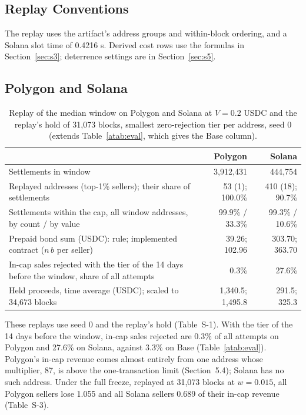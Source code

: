 \documentclass[10pt,a4paper]{article}
\newcommand{\vmax}{V}
\theoremstyle{plain}
\theoremstyle{remark}
\begin{document}
\subsection{Replay Conventions}
\label{sec:dep}

The replay uses the artifact's address groups and within-block ordering, and a Solana slot time of 0.4216 s. Derived cost rows use the formulas in Section~\ref{sec:s3}; deterrence settings are in Section~\ref{sec:s5}.

\subsection{Polygon and Solana}
\label{sec:other}

\begin{table}[!htbp]
\centering
\caption{Replay of the median window on Polygon and Solana at $\vmax=0.2$ USDC and the replay's hold of 31,073 blocks, smallest zero-rejection tier per address, seed 0 (extends Table~\ref{atab:eval}, which gives the Base column).}
\label{tab:S1}
\scriptsize
\setlength{\tabcolsep}{4pt}
\begin{tabular}{@{}>{\raggedright}p{4.6cm}rr@{}}
\toprule
& Polygon & Solana \\
\midrule
Settlements in window & 3,912,431 & 444,754 \\
Replayed addresses (top-1\% sellers); their share of settlements & 53 (1); 100.0\% & 410 (18); 90.7\% \\
Settlements within the cap, all window addresses, by count / by value & 99.9\% / 33.3\% & 99.3\% / 10.6\% \\
Prepaid bond sum (USDC): rule; implemented contract ($n\,b$ per seller) & 39.26; 102.96 & 303.70; 363.70 \\
In-cap sales rejected with the tier of the 14 days before the window, share of all attempts & 0.3\% & 27.6\% \\
Held proceeds, time average (USDC); scaled to 34,673 blocks & 1,340.5; 1,495.8 & 291.5; 325.3 \\
\bottomrule
\end{tabular}
\end{table}

These replays use seed 0 and the replay's hold (Table~S-1). With the tier of the 14 days before the window, in-cap sales rejected are 0.3\% of all attempts on Polygon and 27.6\% on Solana, against 3.3\% on Base (Table~\ref{atab:eval}). Polygon's in-cap revenue comes almost entirely from one address whose multiplier, 87, is above the one-transaction limit (Section~5.4); Solana has no such address. Under the full freeze, replayed at 31,073 blocks at $w=0.015$, all Polygon sellers lose 1.055 and all Solana sellers 0.689 of their in-cap revenue (Table~S-3).
\end{document}
